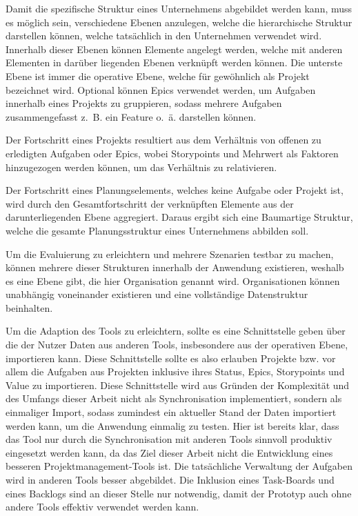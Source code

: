 Damit die spezifische Struktur eines Unternehmens abgebildet werden kann, muss es möglich sein, verschiedene Ebenen anzulegen, welche die hierarchische Struktur darstellen können, welche tatsächlich in den Unternehmen verwendet wird. Innerhalb dieser Ebenen können Elemente angelegt werden, welche mit anderen Elementen in darüber liegenden Ebenen verknüpft werden können.
Die unterste Ebene ist immer die operative Ebene, welche für gewöhnlich als Projekt bezeichnet wird. Optional können Epics verwendet werden, um Aufgaben innerhalb eines Projekts zu gruppieren, sodass mehrere Aufgaben zusammengefasst z. B. ein Feature o. ä. darstellen können.

Der Fortschritt eines Projekts resultiert aus dem Verhältnis von offenen zu erledigten Aufgaben oder Epics, wobei Storypoints und Mehrwert als Faktoren hinzugezogen werden können, um das Verhältnis zu relativieren.

Der Fortschritt eines Planungselements, welches keine Aufgabe oder Projekt ist, wird durch den Gesamtfortschritt der verknüpften Elemente aus der darunterliegenden Ebene aggregiert. Daraus ergibt sich eine Baumartige Struktur, welche die gesamte Planungsstruktur eines Unternehmens abbilden soll.

Um die Evaluierung zu erleichtern und mehrere Szenarien testbar zu machen, können mehrere dieser Strukturen innerhalb der Anwendung existieren, weshalb es eine Ebene gibt, die hier Organisation genannt wird. Organisationen können unabhängig voneinander existieren und eine vollständige Datenstruktur beinhalten.

Um die Adaption des Tools zu erleichtern, sollte es eine Schnittstelle geben über die der Nutzer Daten aus anderen Tools, insbesondere aus der operativen Ebene, importieren kann.
Diese Schnittstelle sollte es also erlauben Projekte bzw. vor allem die Aufgaben aus Projekten inklusive ihres Status, Epics, Storypoints und Value zu importieren. Diese Schnittstelle wird aus Gründen der Komplexität und des Umfangs dieser Arbeit nicht als Synchronisation implementiert, sondern als einmaliger Import, sodass zumindest ein aktueller Stand der Daten importiert werden kann, um die Anwendung einmalig zu testen. Hier ist bereits klar, dass das Tool nur durch die Synchronisation mit anderen Tools sinnvoll produktiv eingesetzt werden kann, da das Ziel dieser Arbeit nicht die Entwicklung eines besseren Projektmanagement-Tools ist. Die tatsächliche Verwaltung der Aufgaben wird in anderen Tools besser abgebildet. Die Inklusion eines Task-Boards und eines Backlogs sind an dieser Stelle nur notwendig, damit der Prototyp auch ohne andere Tools effektiv verwendet werden kann.

